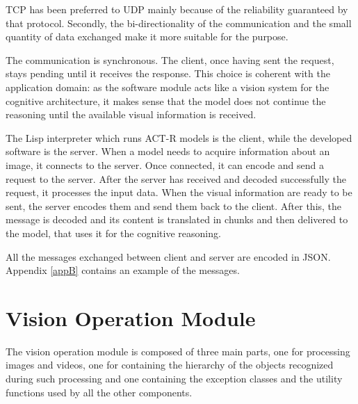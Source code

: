 	TCP has been preferred to \mbox{UDP} mainly because of the reliability guaranteed by that protocol. 
	Secondly, the bi-directionality of the communication and the small quantity of data exchanged make it more suitable for the purpose.

	The communication is synchronous. 
	The client, once having sent the request, stays pending until it receives the response. 
	This choice is coherent with the application domain: as the software module acts like a vision system for the cognitive architecture, it makes sense that the model does not continue the reasoning until the available visual information is received.

	The \mbox{Lisp} interpreter which runs \mbox{ACT-R} models is the client, while the developed software is the server.  	
	When a model needs to acquire information about an image, it connects to the server. 
	Once connected, it can encode and send a request to the server. 
	After the server has received and decoded successfully the request, it processes the input data. When the visual information are ready to be sent, the server encodes them and send them back to the client. 
	After this, the message is decoded and its content is translated in chunks and then delivered to the model, that uses it for the cognitive reasoning.

	All the messages exchanged between client and server are encoded in \mbox{JSON}. 
	Appendix \ref{appB} contains an example of the messages.


	\section{Vision Operation Module}
	The vision operation module is composed of three main parts, one for processing images and videos, one for containing the hierarchy of the objects recognized during such processing and one containing the exception classes and the utility functions used by all the other components.

